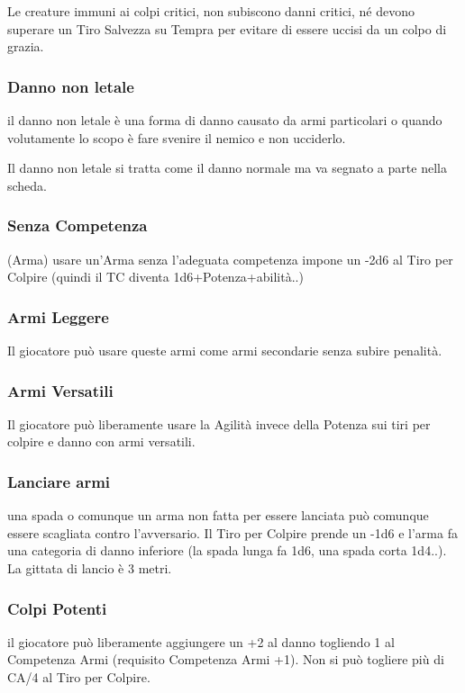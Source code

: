 \documentclass[a4paper,11pt,twoside,openany]{book}
\begin{document}
Le creature immuni ai colpi critici, non subiscono danni critici, né devono superare un Tiro Salvezza su Tempra per evitare di essere uccisi da un colpo di grazia.

\subsubsection{Danno non letale} il danno non letale è una forma di danno causato da armi particolari o quando volutamente lo scopo è fare svenire il nemico e non ucciderlo.

Il danno non letale si tratta come il danno normale ma va segnato a parte nella scheda.

\subsubsection{Senza Competenza} (Arma) usare un'Arma senza l'adeguata competenza impone un -2d6 al Tiro per Colpire (quindi il TC diventa 1d6+Potenza+abilità..)

\subsubsection{Armi Leggere} Il giocatore può usare queste armi come armi secondarie senza subire penalità.

\subsubsection{Armi Versatili} Il giocatore può liberamente usare la Agilità invece della Potenza sui tiri per colpire e danno con armi versatili.

\subsubsection{Lanciare armi} una spada o comunque un arma non fatta per essere lanciata può comunque essere scagliata contro l'avversario.
Il Tiro per Colpire prende un -1d6 e l'arma fa una categoria di danno inferiore (la spada lunga fa 1d6, una spada corta 1d4..). La gittata di lancio è 3 metri.

\subsubsection{Colpi Potenti} il giocatore può liberamente aggiungere un +2 al danno togliendo 1 al Competenza Armi (requisito Competenza Armi +1). Non si può togliere più di CA/4 al Tiro per Colpire.
\end{document}
